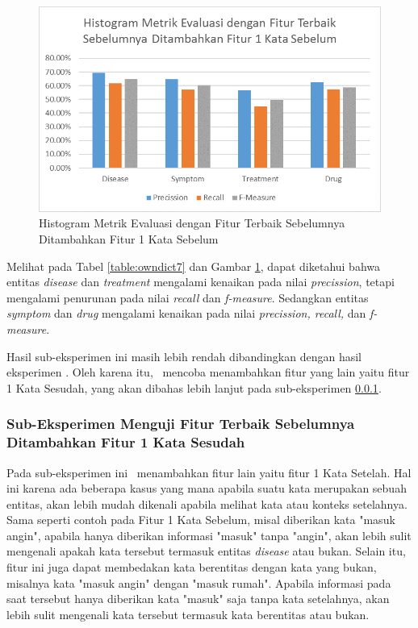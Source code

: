 	\begin{figure}
		\centering
		\includegraphics[width=0.85\linewidth]{images/histogram7}
		\caption{Histogram Metrik Evaluasi dengan Fitur Terbaik Sebelumnya Ditambahkan Fitur 1 Kata Sebelum}
		\label{fig:owndict7}
	\end{figure}
	
	Melihat pada Tabel \ref{table:owndict7} dan Gambar \ref{fig:owndict7}, dapat diketahui bahwa entitas \textit{disease} dan \textit{treatment} mengalami kenaikan pada nilai \textit{precission}, tetapi mengalami penurunan pada nilai \textit{recall} dan \textit{f-measure}. Sedangkan entitas \textit{symptom} dan \textit{drug} mengalami kenaikan pada nilai \textit{precission, recall,} dan \textit{f-measure}.
	
	Hasil sub-eksperimen ini masih lebih rendah dibandingkan dengan hasil eksperimen \cite{skripsiKakRadit}. Oleh karena itu, \saya~mencoba menambahkan fitur yang lain yaitu fitur 1 Kata Sesudah, yang akan dibahas lebih lanjut pada sub-eksperimen \ref{eks:subekswaf1}.
	
	
	\subsubsection{Sub-Eksperimen Menguji Fitur Terbaik Sebelumnya Ditambahkan Fitur 1 Kata Sesudah}\label{eks:subekswaf1}
	Pada sub-eksperimen ini \saya~menambahkan fitur lain yaitu fitur 1 Kata Setelah. Hal ini karena ada beberapa kasus yang mana apabila suatu kata merupakan sebuah entitas, akan lebih mudah dikenali apabila melihat kata atau konteks setelahnya. Sama seperti contoh pada Fitur 1 Kata Sebelum, misal diberikan kata "masuk angin", apabila hanya diberikan informasi "masuk" tanpa "angin", akan lebih sulit mengenali apakah kata tersebut termasuk entitas \textit{disease} atau bukan. Selain itu, fitur ini juga dapat membedakan kata berentitas dengan kata yang bukan, misalnya kata "masuk angin" dengan "masuk rumah". Apabila informasi pada saat tersebut hanya diberikan kata "masuk" saja tanpa kata setelahnya, akan lebih sulit mengenali kata tersebut termasuk kata berentitas atau bukan.
	
